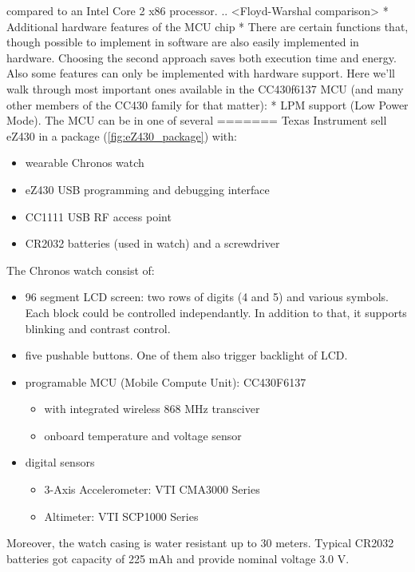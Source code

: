 \begin{commnet}
          compared to an Intel Core 2 x86 processor. .. <Floyd-Warshal
          comparison>
    * Additional hardware features of the MCU chip
      * There are certain functions that, though possible to implement in
        software are also easily implemented in hardware. Choosing the second
        approach saves both execution time and energy.  Also some features can
        only be implemented with hardware support.  Here we'll walk through most
        important ones available in the CC430f6137 MCU (and many other members of
        the CC430 family for that matter):
      * LPM support (Low Power Mode). The MCU can be in one of several
=======
Texas Instrument sell eZ430 in a package (\ref{fig:eZ430_package}) with:
\begin{itemize}
  \item wearable Chronos watch
  \item eZ430 USB programming and debugging interface
  \item CC1111 USB RF access point
  \item CR2032 batteries (used in watch) and a screwdriver
\end{itemize}

The Chronos watch consist of:
\begin{itemize}
  \item 96 segment LCD screen: two rows of digits (4 and 5) and various symbols. Each block could be controlled independantly. In addition to that, it supports blinking and contrast control.
  \item five pushable buttons. One of them also trigger backlight of LCD.
  \item programable MCU (Mobile Compute Unit): CC430F6137
\begin{itemize}
    \item with integrated wireless 868 MHz transciver
    \item onboard temperature and voltage sensor
\end{itemize}
  \item digital sensors
\begin{itemize}
    \item 3-Axis Accelerometer: VTI CMA3000 Series
    \item Altimeter: VTI SCP1000 Series
\end{itemize}
\end{itemize}

Moreover, the watch casing is water resistant up to 30 meters.
Typical CR2032 batteries got capacity of 225 mAh and provide nominal voltage 3.0 V.


\end{commnet}
